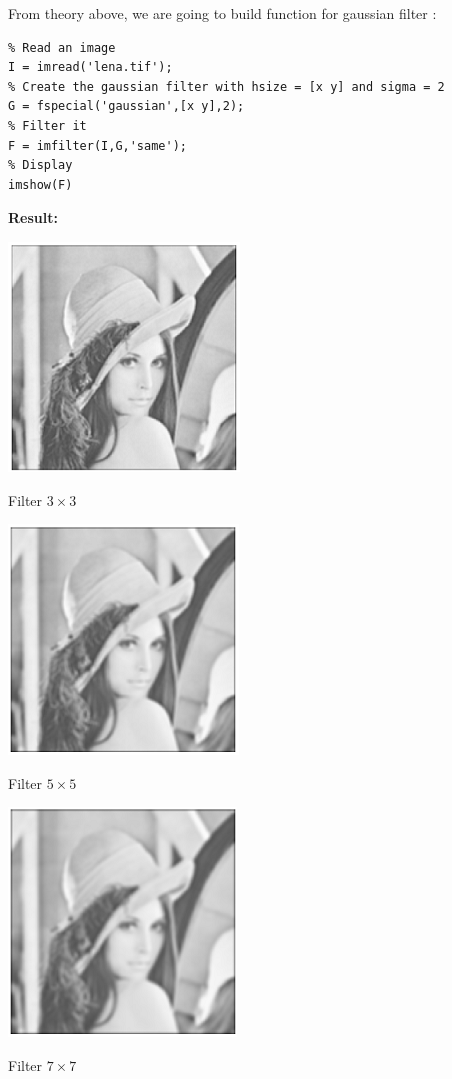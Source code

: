From theory above, we are going to build function for gaussian filter :
\begin{lstlisting}
% Read an image
I = imread('lena.tif');
% Create the gaussian filter with hsize = [x y] and sigma = 2
G = fspecial('gaussian',[x y],2);
% Filter it
F = imfilter(I,G,'same');
% Display
imshow(F)	
\end{lstlisting}
\textbf{Result:}
\begin{center}
	\includegraphics{b3x3.png}
	
	Filter $3\times3$
	
	\includegraphics{b5x5.png}
	
	Filter $5\times5$
	
	\includegraphics{b7x7.png}
	
	Filter $7\times7$
\end{center}
\newpage
